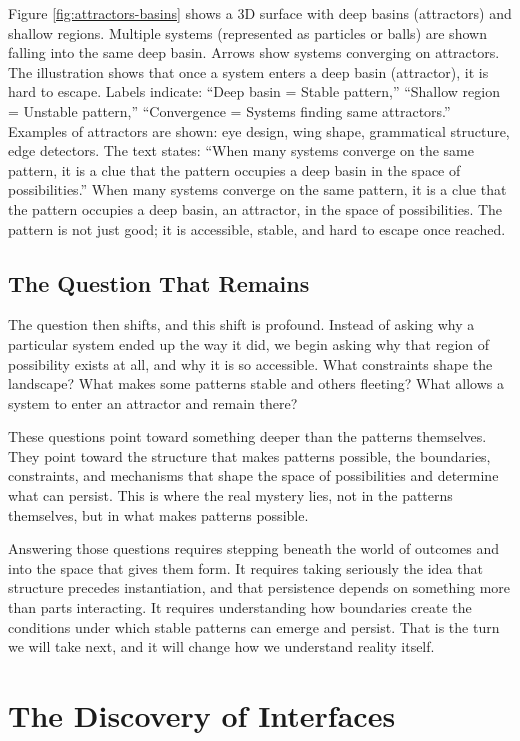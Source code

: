 \documentclass[
  openright]{book}
\begin{document}
Figure \ref{fig:attractors-basins} shows a 3D surface with deep basins
(attractors) and shallow regions. Multiple systems (represented as
particles or balls) are shown falling into the same deep basin. Arrows
show systems converging on attractors. The illustration shows that once
a system enters a deep basin (attractor), it is hard to escape. Labels
indicate: ``Deep basin = Stable pattern,'' ``Shallow region = Unstable
pattern,'' ``Convergence = Systems finding same attractors.'' Examples
of attractors are shown: eye design, wing shape, grammatical structure,
edge detectors. The text states: ``When many systems converge on the
same pattern, it is a clue that the pattern occupies a deep basin in the
space of possibilities.'' When many systems converge on the same
pattern, it is a clue that the pattern occupies a deep basin, an
attractor, in the space of possibilities. The pattern is not just good;
it is accessible, stable, and hard to escape once reached.

\section{The Question That Remains}\label{the-question-that-remains}

The question then shifts, and this shift is profound. Instead of asking
why a particular system ended up the way it did, we begin asking why
that region of possibility exists at all, and why it is so accessible.
What constraints shape the landscape? What makes some patterns stable
and others fleeting? What allows a system to enter an attractor and
remain there?

These questions point toward something deeper than the patterns
themselves. They point toward the structure that makes patterns
possible, the boundaries, constraints, and mechanisms that shape the
space of possibilities and determine what can persist. This is where the
real mystery lies, not in the patterns themselves, but in what makes
patterns possible.

Answering those questions requires stepping beneath the world of
outcomes and into the space that gives them form. It requires taking
seriously the idea that structure precedes instantiation, and that
persistence depends on something more than parts interacting. It
requires understanding how boundaries create the conditions under which
stable patterns can emerge and persist. That is the turn we will take
next, and it will change how we understand reality itself.

\chapter{The Discovery of Interfaces}\label{the-discovery-of-interfaces}
\end{document}
